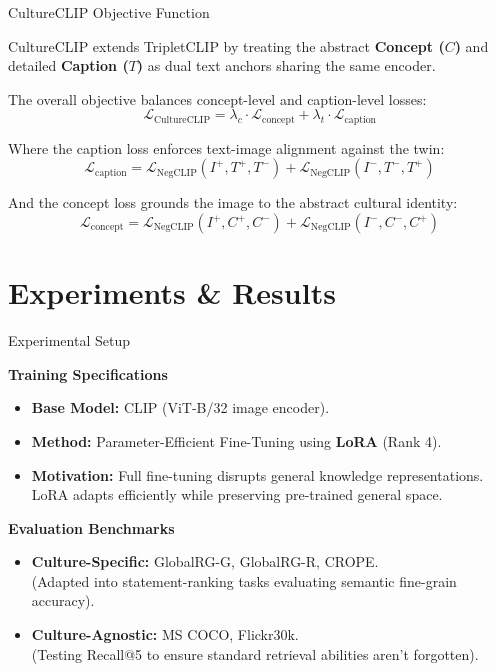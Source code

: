 \documentclass[aspectratio=169]{beamer}
\begin{document}
\begin{frame}{CultureCLIP Objective Function}
  
  CultureCLIP extends TripletCLIP by treating the abstract \textbf{Concept ($C$)} and detailed \textbf{Caption ($T$)} as dual text anchors sharing the same encoder.
  
  \vspace{0.4cm}
  The overall objective balances concept-level and caption-level losses:
  $$ \mathcal{L}_{\text{CultureCLIP}} = \lambda_c \cdot \mathcal{L}_{\text{concept}} + \lambda_t \cdot \mathcal{L}_{\text{caption}} $$
  
  Where the caption loss enforces text-image alignment against the twin:
  $$ \mathcal{L}_{\text{caption}} = \mathcal{L}_{\text{NegCLIP}}(I^+, T^+, T^-) + \mathcal{L}_{\text{NegCLIP}}(I^-, T^-, T^+) $$
  
  And the concept loss grounds the image to the abstract cultural identity:
  $$ \mathcal{L}_{\text{concept}} = \mathcal{L}_{\text{NegCLIP}}(I^+, C^+, C^-) + \mathcal{L}_{\text{NegCLIP}}(I^-, C^-, C^+) $$
  
\end{frame}

\section{Experiments \& Results}

\begin{frame}{Experimental Setup}
  
  \textbf{Training Specifications}
  \begin{itemize}
    \item \textbf{Base Model:} CLIP (ViT-B/32 image encoder).
    \item \textbf{Method:} Parameter-Efficient Fine-Tuning using \textbf{LoRA} (Rank 4).
    \item \textbf{Motivation:} Full fine-tuning disrupts general knowledge representations. LoRA adapts efficiently while preserving pre-trained general space.
  \end{itemize}

  \vspace{0.3cm}
  \textbf{Evaluation Benchmarks}
  \begin{itemize}
    \item \textbf{Culture-Specific:} GlobalRG-G, GlobalRG-R, CROPE. \\
          (Adapted into statement-ranking tasks evaluating semantic fine-grain accuracy).
    \item \textbf{Culture-Agnostic:} MS COCO, Flickr30k. \\
          (Testing Recall@5 to ensure standard retrieval abilities aren't forgotten).
  \end{itemize}
  
\end{frame}
\end{document}
